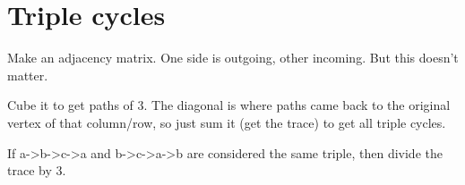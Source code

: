\documentclass[11pt,letterpaper]{article}
\begin{document}
	\section{Triple cycles}
		Make an adjacency matrix.
		One side is outgoing, other incoming. But this doesn't matter.
		
		Cube it to get paths of 3.
		The diagonal is where paths came back to the original vertex of that column/row, so just sum it (get the trace) to get all triple cycles.
		
		If a->b->c->a and b->c->a->b are considered the same triple, then divide the trace by 3.
	
\end{document}
